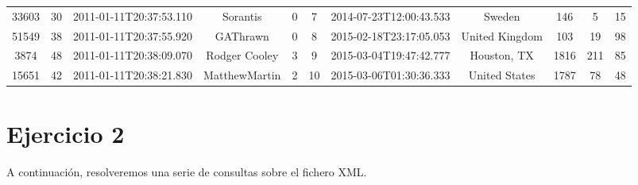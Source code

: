 \documentclass[12pt,a4paper,twoside,openright,titlepage,final]{article}
\begin{document}
\begin{table}[htbp!]
{\begin{tabular}{@{}ccccccccccc@{}}
		33603              & 30           & 2011-01-11T20:37:53.110 & Sorantis             & 0                  & 7           & 2014-07-23T12:00:43.533 & Sweden                  & 146                 & 5                & 15             \\
		51549              & 38           & 2011-01-11T20:37:55.920 & GAThrawn             & 0                  & 8           & 2015-02-18T23:17:05.053 & United Kingdom          & 103                 & 19               & 98             \\
		3874               & 48           & 2011-01-11T20:38:09.070 & Rodger Cooley        & 3                  & 9           & 2015-03-04T19:47:42.777 & Houston, TX             & 1816                & 211              & 85             \\
		15651              & 42           & 2011-01-11T20:38:21.830 & MatthewMartin        & 2                  & 10          & 2015-03-06T01:30:36.333 & United States           & 1787                & 78               & 48             \\ \bottomrule
		\end{tabular}
		}
		\end{table}

\section{Ejercicio 2}
A continuación, resolveremos una serie de consultas sobre el fichero XML.
\end{document}
